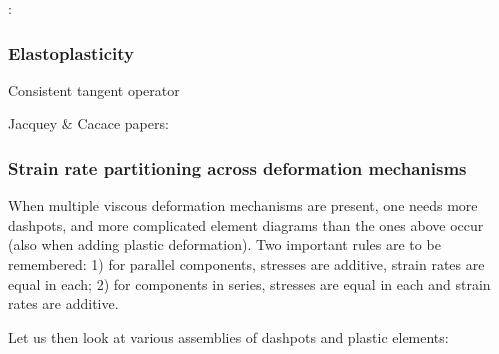 \Literature: \cite{boph12}

\subsubsection{Elastoplasticity} 

Consistent tangent operator \cite{sita85,degr94,szjo95}

Jacquey \& Cacace papers: \cite{jaca20a,jaca20b}


\subsubsection{Strain rate partitioning across deformation mechanisms}\label{ss:srpart}

When multiple viscous deformation mechanisms are present, one needs more dashpots, and 
more complicated element diagrams than the ones above occur (also when adding plastic deformation).
Two important rules are to be remembered:
1) for parallel components, stresses are additive, strain rates are equal in each; 
2) for components in series, stresses are equal in each and strain rates are additive. 

Let us then look at various assemblies of dashpots and plastic elements:

